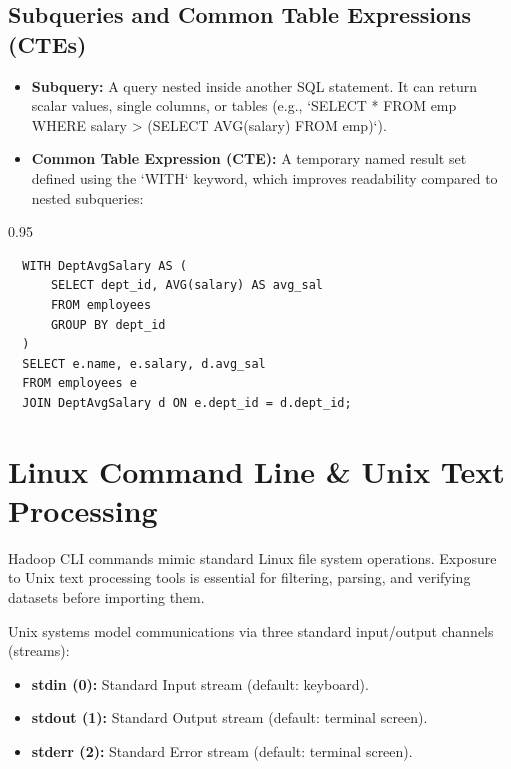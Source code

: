 \documentclass[12pt,a4paper]{article}
\begin{document}
\subsection{Subqueries and Common Table Expressions (CTEs)}
\begin{itemize}[leftmargin=*, itemsep=3pt]
  \item \textbf{Subquery:} A query nested inside another SQL statement. It can return scalar values, single columns, or tables (e.g., `SELECT * FROM emp WHERE salary > (SELECT AVG(salary) FROM emp)`).
  \item \textbf{Common Table Expression (CTE):} A temporary named result set defined using the `WITH` keyword, which improves readability compared to nested subqueries:
\end{itemize}

\begin{tcolorbox}[examplebox, title={Common Table Expression (CTE) Syntax}]
  \begin{spacing}{0.95}
  \begin{verbatim}
  WITH DeptAvgSalary AS (
      SELECT dept_id, AVG(salary) AS avg_sal
      FROM employees
      GROUP BY dept_id
  )
  SELECT e.name, e.salary, d.avg_sal
  FROM employees e
  JOIN DeptAvgSalary d ON e.dept_id = d.dept_id;
  \end{verbatim}
  \end{spacing}
\end{tcolorbox}

\section{Linux Command Line \& Unix Text Processing}

Hadoop CLI commands mimic standard Linux file system operations. Exposure to Unix text processing tools is essential for filtering, parsing, and verifying datasets before importing them.

\begin{tcolorbox}[defbox, title={Unix Streams}]
  Unix systems model communications via three standard input/output channels (streams):
  \begin{itemize}[leftmargin=*, noitemsep]
    \item \textbf{stdin (0):} Standard Input stream (default: keyboard).
    \item \textbf{stdout (1):} Standard Output stream (default: terminal screen).
    \item \textbf{stderr (2):} Standard Error stream (default: terminal screen).
  \end{itemize}
\end{tcolorbox}
\end{document}
